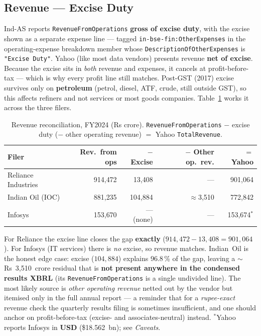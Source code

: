 \documentclass[11pt,a4paper]{report}
\begin{document}
\subsection{Revenue --- Excise Duty}
Ind-AS reports \texttt{RevenueFromOperations} \textbf{gross of excise duty}, with the excise shown as a
separate expense line --- tagged \texttt{in-bse-fin:OtherExpenses} in the operating-expense breakdown member
whose \texttt{DescriptionOfOtherExpenses} is \texttt{"Excise Duty"}. Yahoo (like most data vendors) presents
revenue \textbf{net of excise}. Because the excise sits in \emph{both} revenue and expenses, it cancels at
profit-before-tax --- which is why every profit line still matches. Post-GST (2017) excise survives only on
\textbf{petroleum} (petrol, diesel, ATF, crude, still outside GST), so this affects refiners and not
services or most goods companies. Table~\ref{tab:india-rev-recon} works it across the three filers.

\begin{table}[h]
\centering
\small
\caption{Revenue reconciliation, FY2024 (Rs crore). \texttt{RevenueFromOperations} $-$ excise duty
($-$ other operating revenue) $=$ Yahoo \texttt{TotalRevenue}.}
\label{tab:india-rev-recon}
\begin{tabular}{@{}p{}rrrr@{}}
\toprule
\textbf{Filer} & \textbf{Rev.\ from ops} & \textbf{$-$ Excise} & \textbf{$-$ Other op.\ rev.} & \textbf{$=$ Yahoo} \\
\midrule
Reliance Industries & 914{,}472 & 13{,}408 & --- & 901{,}064 \\
Indian Oil (IOC)    & 881{,}235 & 104{,}884 & $\approx$3{,}510 & 772{,}842 \\
Infosys             & 153{,}670 & --- (none) & --- & 153{,}674$^{*}$ \\
\bottomrule
\end{tabular}
\end{table}

\noindent For Reliance the excise line closes the gap \textbf{exactly} ($914{,}472 - 13{,}408 = 901{,}064$).
For Infosys (IT services) there is \emph{no} excise, so revenue matches. Indian~Oil is the honest edge case:
excise ($104{,}884$) explains 96.8\,\% of the gap, leaving a $\sim$Rs~3{,}510~crore residual that is
\textbf{not present anywhere in the condensed results XBRL} (its \texttt{RevenueFromOperations} is a single
undivided line). The most likely source is \emph{other operating revenue} netted out by the vendor but
itemised only in the full annual report --- a reminder that for a \emph{rupee-exact} revenue check the
quarterly results filing is sometimes insufficient, and one should anchor on profit-before-tax (excise- and
associates-neutral) instead. \footnotesize$^{*}$Yahoo reports Infosys in \textbf{USD} (\$18.562~bn); see
\emph{Caveats}.\normalsize
\end{document}
